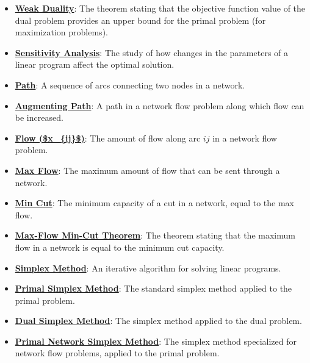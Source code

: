 \documentclass{article}%
\begin{document}
\begin{itemize}[leftmargin=*]
\item \href{https://www.math.purdue.edu/~yipn/421/2024-11-21-EconNetSimplex.pdf#page=4}{\textbf{Weak Duality}}: The theorem stating that the objective function value of the dual problem provides an upper bound for the primal problem (for maximization problems). %
\item \href{https://www.math.purdue.edu/~yipn/421/2024-11-21-EconNetSimplex.pdf#page=1}{\textbf{Sensitivity Analysis}}: The study of how changes in the parameters of a linear program affect the optimal solution. %
\item \href{https://www.math.purdue.edu/~yipn/421/2024-11-21-EconNetSimplex.pdf#page=4}{\textbf{Path}}: A sequence of arcs connecting two nodes in a network. %
\item \href{https://www.math.purdue.edu/~yipn/421/2024-11-21-EconNetSimplex.pdf#page=4}{\textbf{Augmenting Path}}: A path in a network flow problem along which flow can be increased. %
\item \href{https://www.math.purdue.edu/~yipn/421/2024-11-21-EconNetSimplex.pdf#page=4}{\textbf{Flow (\$x\_\{ij\}\$)}}: The amount of flow along arc $ij$ in a network flow problem. %
\item \href{https://www.math.purdue.edu/~yipn/421/2024-11-21-EconNetSimplex.pdf#page=4}{\textbf{Max Flow}}: The maximum amount of flow that can be sent through a network. %
\item \href{https://www.math.purdue.edu/~yipn/421/2024-11-21-EconNetSimplex.pdf#page=4}{\textbf{Min Cut}}: The minimum capacity of a cut in a network, equal to the max flow. %
\item \href{https://www.math.purdue.edu/~yipn/421/2024-11-21-EconNetSimplex.pdf#page=4}{\textbf{Max{-}Flow Min{-}Cut Theorem}}: The theorem stating that the maximum flow in a network is equal to the minimum cut capacity. %
\item \href{https://www.math.purdue.edu/~yipn/421/2024-11-21-EconNetSimplex.pdf#page=4}{\textbf{Simplex Method}}: An iterative algorithm for solving linear programs. %
\item \href{https://www.math.purdue.edu/~yipn/421/2024-11-21-EconNetSimplex.pdf#page=7}{\textbf{Primal Simplex Method}}: The standard simplex method applied to the primal problem. %
\item \href{https://www.math.purdue.edu/~yipn/421/2024-11-21-EconNetSimplex.pdf#page=7}{\textbf{Dual Simplex Method}}: The simplex method applied to the dual problem. %
\item \href{https://www.math.purdue.edu/~yipn/421/2024-11-21-EconNetSimplex.pdf#page=7}{\textbf{Primal Network Simplex Method}}: The simplex method specialized for network flow problems, applied to the primal problem. %

\end{itemize}
\end{document}
